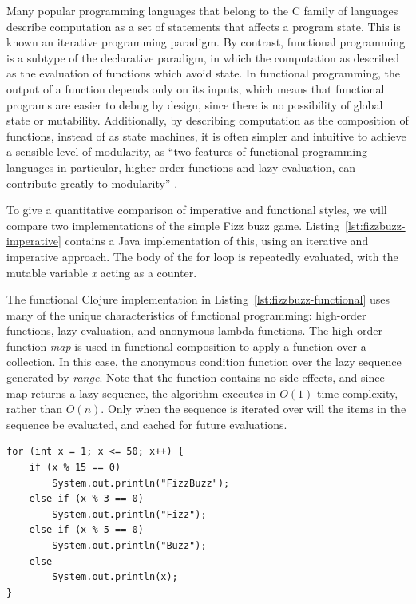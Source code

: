 Many popular programming languages that belong to the C family of
languages describe computation as a set of statements that affects a
program state. This is known an iterative programming paradigm. By
contrast, functional programming is a subtype of the declarative
paradigm, in which the computation as described as the evaluation of
functions which avoid state. In functional programming, the output of
a function depends only on its inputs, which means that functional
programs are easier to debug by design, since there is no possibility
of global state or mutability. Additionally, by describing computation
as the composition of functions, instead of as state machines, it is
often simpler and intuitive to achieve a sensible level of modularity,
as ``two features of functional programming languages in particular,
higher-order functions and lazy evaluation, can contribute greatly to
modularity'' \cite{hughes1989functional}.

To give a quantitative comparison of imperative and functional styles,
we will compare two implementations of the simple Fizz buzz
game. Listing~\ref{lst:fizzbuzz-imperative} contains a Java
implementation of this, using an iterative and imperative
approach. The body of the for loop is repeatedly evaluated, with the
mutable variable \textit{x} acting as a counter.

The functional Clojure implementation in
Listing~\ref{lst:fizzbuzz-functional} uses many of the unique
characteristics of functional programming: high-order functions, lazy
evaluation, and anonymous lambda functions. The high-order function
\textit{map} is used in functional composition to apply a function
over a collection. In this case, the anonymous condition function over
the lazy sequence generated by \textit{range}. Note that the function
contains no side effects, and since map returns a lazy sequence, the
algorithm executes in $O(1)$ time complexity, rather than $O(n)$. Only
when the sequence is iterated over will the items in the sequence be
evaluated, and cached for future evaluations.

\lstset{language=java}
\begin{lstlisting}[label=lst:fizzbuzz-imperative,caption={
      [An imperative implementation of Fizz buzz in Java]
       An imperative implementation of Fizz buzz in Java.}]
for (int x = 1; x <= 50; x++) {
    if (x % 15 == 0)
        System.out.println("FizzBuzz");
    else if (x % 3 == 0)
        System.out.println("Fizz");
    else if (x % 5 == 0)
        System.out.println("Buzz");
    else
        System.out.println(x);
}
\end{lstlisting}

